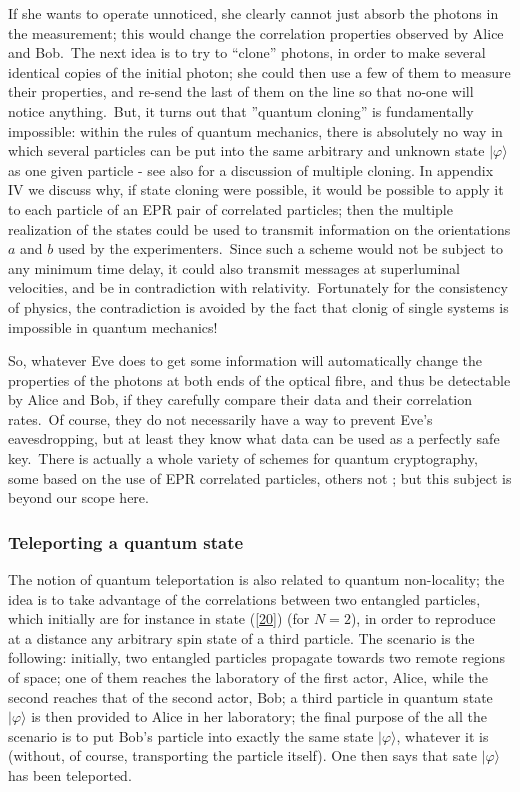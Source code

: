 \documentclass[12pt,onecolumn]{article}%
\begin{document}
If she wants to operate unnoticed, she clearly cannot just absorb the photons
in the measurement; this would change the correlation properties observed by
Alice and Bob.\ The next idea is to try to ``clone'' photons, in order to make
several identical copies of the initial photon; she could then use a few of
them to measure their properties, and re-send the last of them on the line so
that no-one will notice anything.\ But, it turns out that ''quantum cloning''
is fundamentally impossible: within the rules of quantum mechanics, there is
absolutely no way in which several particles can be put into the same
arbitrary and unknown state $|\varphi\rangle$ as one given particle
\cite{Wooters-Zurek} \cite{Dieks} - see also \cite{Gisin-Massar} for a
discussion of multiple cloning. In appendix IV we discuss why, if state
cloning were possible, it would be possible to apply it to each particle of an
EPR pair of correlated particles; then the multiple realization of the states
could be used to transmit information on the orientations $a$ and $b$ used by
the experimenters.\ Since such a scheme would not be subject to any minimum
time delay, it could also transmit messages at superluminal velocities, and be
in contradiction with relativity.\ Fortunately for the consistency of physics,
the contradiction is avoided by the fact that clonig of single systems is
impossible in quantum mechanics!

So, whatever Eve does to get some information will automatically change the
properties of the photons at both ends of the optical fibre, and thus be
detectable by Alice and Bob, if they carefully compare their data and their
correlation rates.\ Of course, they do not necessarily have a way to prevent
Eve's eavesdropping, but at least they know what data can be used as a
perfectly safe key.\ There is actually a whole variety of schemes for quantum
cryptography, some based on the use of EPR correlated particles, others not
\cite{Bennett2}; but this subject is beyond our scope here.

\subsubsection{Teleporting a quantum state}

The notion of quantum teleportation \cite{Bennett1} is also related to quantum
non-locality; the idea is to take advantage of the correlations between two
entangled particles, which initially are for instance in state (\ref{20}) (for
$N=2$), in order to reproduce at a distance any arbitrary spin state of a
third particle. The scenario is the following: initially, two entangled
particles propagate towards two remote regions of space; one of them reaches
the laboratory of the first actor, Alice, while the second reaches that of the
second actor, Bob; a third particle in quantum state $|\varphi\rangle$ is then
provided to Alice in her laboratory; the final purpose of the all the scenario
is to put Bob's particle into exactly the same state $|\varphi\rangle$, whatever
it is (without, of course, transporting the particle itself). One then says
that sate $|\varphi\rangle$ has been teleported.
\end{document}
